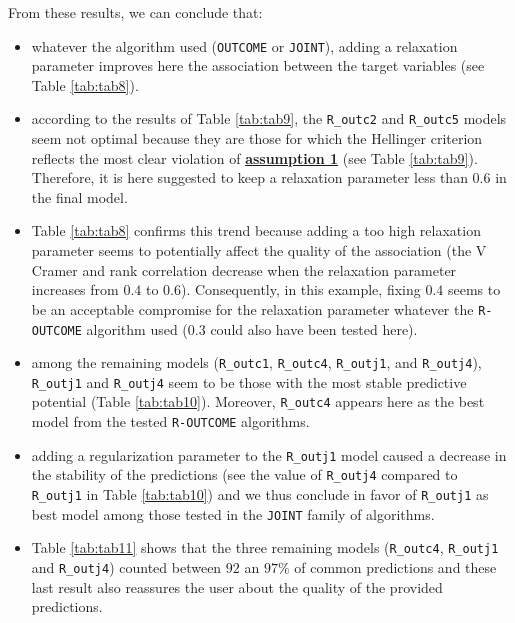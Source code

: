 From these results, we can conclude that:

\begin{itemize}
\tightlist
\item
  whatever the algorithm used (\texttt{OUTCOME} or \texttt{JOINT}), adding a relaxation parameter improves here the association between the target variables (see Table \ref{tab:tab8}).
\item
  according to the results of Table \ref{tab:tab9}, the \texttt{R\_outc2} and \texttt{R\_outc5} models seem not optimal because they are those for which the Hellinger criterion reflects the most clear violation of \protect\hyperlink{optt}{\textbf{assumption 1}} (see Table \ref{tab:tab9}). Therefore, it is here suggested to keep a relaxation parameter less than \(0.6\) in the final model.
\item
  Table \ref{tab:tab8} confirms this trend because adding a too high relaxation parameter seems to potentially affect the quality of the association (the V Cramer and rank correlation decrease when the relaxation parameter increases from \(0.4\) to \(0.6\)). Consequently, in this example, fixing \(0.4\) seems to be an acceptable compromise for the relaxation parameter whatever the \texttt{R-OUTCOME} algorithm used (\(0.3\) could also have been tested here).
\item
  among the remaining models (\texttt{R\_outc1}, \texttt{R\_outc4}, \texttt{R\_outj1}, and \texttt{R\_outj4}), \texttt{R\_outj1} and \texttt{R\_outj4} seem to be those with the most stable predictive potential (Table \ref{tab:tab10}). Moreover, \texttt{R\_outc4} appears here as the best model from the tested \texttt{R-OUTCOME} algorithms.
\item
  adding a regularization parameter to the \texttt{R\_outj1} model caused a decrease in the stability of the predictions (see the value of \texttt{R\_outj4} compared to \texttt{R\_outj1} in Table \ref{tab:tab10}) and we thus conclude in favor of \texttt{R\_outj1} as best model among those tested in the \texttt{JOINT} family of algorithms.
\item
  Table \ref{tab:tab11} shows that the three remaining models (\texttt{R\_outc4}, \texttt{R\_outj1} and \texttt{R\_outj4}) counted between \(92\) an \(97\%\) of common predictions and these last result also reassures the user about the quality of the provided predictions.
\end{itemize}

